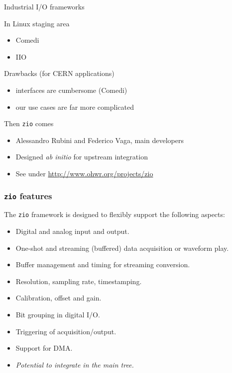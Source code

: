 \documentclass[compress,red]{beamer}
\begin{document}
\begin{frame}{Industrial I/O frameworks}

\pause
\begin{block}{In Linux staging area}
\begin{itemize}
\item Comedi
\item IIO
\end{itemize}
\end{block}

\pause
\begin{block}{Drawbacks (for CERN applications)}
\begin{itemize}
\item interfaces are cumbersome (Comedi)
\item our use cases are far more complicated
\end{itemize}
\end{block}

\pause
\begin{block}{Then \texttt{zio} comes}
\begin{itemize}
\item Alessandro Rubini and Federico Vaga, main developers
\item Designed \emph{ab initio} for upstream integration
\item See under \url{http://www.ohwr.org/projects/zio}
\end{itemize}
\end{block}

\end{frame}

\begin{frame}
\frametitle{\texttt{zio} features}

The \texttt{zio} framework is designed to flexibly support the following
aspects:
\begin{itemize}
\pause\item Digital and analog input and output.
\pause\item One-shot and streaming (buffered) data acquisition or waveform play.
\pause\item Buffer management and timing for streaming conversion.
\pause\item Resolution, \pause sampling rate, \pause timestamping.
\pause\item Calibration, \pause offset \pause and gain.
\pause\item Bit grouping in digital I/O.
\pause\item Triggering of acquisition/output.
\pause\item Support for DMA.
\pause\item \emph{Potential to integrate in the main tree.}
\end{itemize}

\end{frame}
\end{document}
